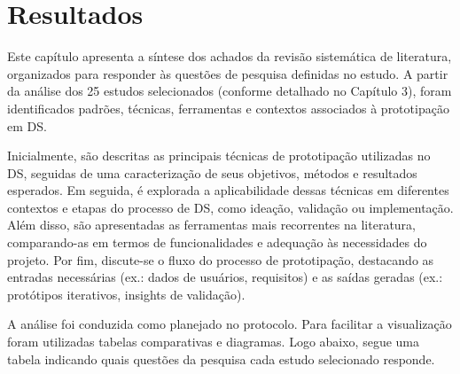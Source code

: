 \chapter[Resultados]{Resultados}


Este capítulo apresenta a síntese dos achados da revisão sistemática de literatura, organizados para responder às questões de pesquisa definidas no estudo. A partir da análise dos 25 estudos selecionados (conforme detalhado no Capítulo 3), foram identificados padrões, técnicas, ferramentas e contextos associados à prototipação em DS.

Inicialmente, são descritas as principais técnicas de prototipação utilizadas no DS, seguidas de uma caracterização de seus objetivos, métodos e resultados esperados. Em seguida, é explorada a aplicabilidade dessas técnicas em diferentes contextos e etapas do processo de DS, como ideação, validação ou implementação. Além disso, são apresentadas as ferramentas mais recorrentes na literatura, comparando-as em termos de funcionalidades e adequação às necessidades do projeto. Por fim, discute-se o fluxo do processo de prototipação, destacando as entradas necessárias (ex.: dados de usuários, requisitos) e as saídas geradas (ex.: protótipos iterativos, insights de validação).

A análise foi conduzida como planejado no protocolo. Para facilitar a visualização foram utilizadas tabelas comparativas e diagramas. Logo abaixo, segue uma tabela indicando quais questões da pesquisa cada estudo selecionado responde.

